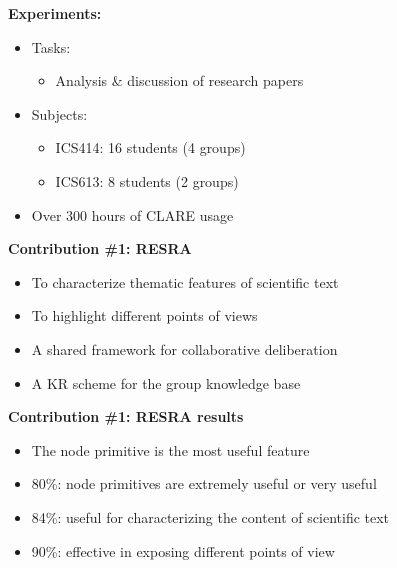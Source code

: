 \begin{slide} \Huge
  {\bf Experiments:}
  \horizontalline
  \begin{itemize}
  \item Tasks:
    \begin{itemize}
    \item Analysis \& discussion of research papers
    \end{itemize}
    
  \item Subjects:
    \begin{itemize}
    \item ICS414: 16 students (4 groups)
      
    \item ICS613: 8 students (2 groups)
    \end{itemize}
    
  \item Over 300 hours of CLARE usage
    \end{itemize}    
\end{slide} \Huge    


\begin{slide} \Huge 
  {\bf Contribution \#1: RESRA}
  \horizontalline

  \begin{itemize}
    \item To characterize thematic features of scientific text
      
    \item To highlight different points of views

    \item A shared framework for collaborative deliberation
      
    \item A KR scheme for the group knowledge base
  \end{itemize}
\end{slide} \Huge


\begin{slide} \Huge 
  {\bf Contribution \#1: RESRA results}
  \horizontalline
  \begin{itemize}

  \item The node primitive is the most useful feature

  \item 80\%: node primitives are extremely useful or very useful        

  \item 84\%: useful for characterizing the content of scientific text

  \item 90\%: effective in exposing different points of view
  \end{itemize}    
\end{slide} \Huge


